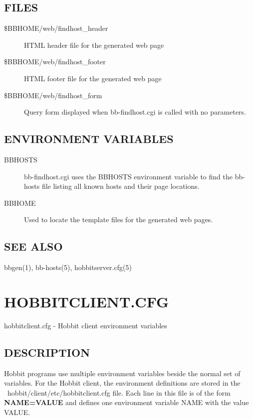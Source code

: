 \subsection{FILES}
\begin{description}
\item[\$BBHOME/web/findhost\_header] HTML header file for the generated web page 

 

\item[\$BBHOME/web/findhost\_footer] HTML footer file for the generated web page 

 

\item[\$BBHOME/web/findhost\_form] Query form displayed when
  bb-findhost.cgi is called with no parameters. 


\end{description}
\subsection{ENVIRONMENT VARIABLES}
\begin{description}
\item[BBHOSTS] bb-findhost.cgi uses the BBHOSTS environment variable
  to find the bb-hosts file listing all known hosts and their page
  locations. 


\item[BBHOME] Used to locate the template files for the generated web pages. 


\end{description}
\subsection{SEE ALSO}
bbgen(1), bb-hosts(5), hobbitserver.cfg(5) 

 
%
\newpage
\section{HOBBITCLIENT.CFG}

 hobbitclient.cfg - Hobbit client environment variables 

 

\subsection{DESCRIPTION}
 Hobbit programs use multiple environment variables beside the normal
 set of variables. For the Hobbit client, the environment definitions
 are stored in the ~hobbit/client/etc/hobbitclient.cfg file. Each line
 in this file is of the form \textbf{NAME=VALUE} and defines one
 environment variable NAME with the value VALUE. 


